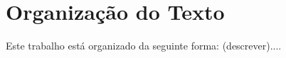 \section{Organização do Texto}

Este trabalho está organizado da seguinte forma: (descrever)....










